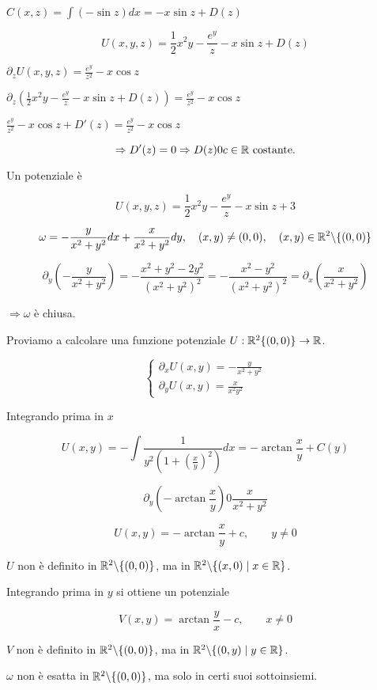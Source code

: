 \begin{exbar}
\begin{example}
	{\color{blue}$C(x,z)=\int (-\sin z)dx=-x\sin z+D(z)$}
	
	$$U(x,y,z)=\frac{1}{2}x^2y-\frac{e^y}{z}-x\sin z+D(z)$$
	
	$\partial_z U(x,y,z)=\frac{e^y}{z^2}-x\cos z$
	
	$\partial_z\left( \frac{1}{2}x^2y-\frac{e^y}{z}-x\sin z + D(z) \right)=\frac{e^y}{z^2}-x\cos z$
	
	$\frac{e^y}{z^2}-x\cos z+ D'(z)=\frac{e^y}{z^2}-x\cos z$
	
	$$\Rightarrow D'(z)=0\Rightarrow D(z)0c \in \mathbb{R} \text{ costante.}$$
	
	Un potenziale è 
	
	$$U(x,y,z)=\frac{1}{2}x^2y-\frac{e^y}{z}-x\sin z +3$$
\end{example}
\end{exbar}


\begin{exbar}
\begin{example}
	$$\omega = - \frac{y}{x^2+y^2}dx+\frac{x}{x^2+y^2}dy, \quad (x,y)\neq(0,0), \quad (x,y)\in \mathbb{R}^2\backslash\{(0,0)\}$$
	
	$$\partial_y\left( -\frac{y}{x^2+y^2} \right)=-\frac{x^2+y^2-2y^2}{(x^2+y^2)^2}=-\frac{x^2-y^2}{(x^2+y^2)^2}=\partial_x\left( \frac{x}{x^2+y^2} \right)$$
	
	$\Rightarrow \omega$ è chiusa.
	
	Proviamo a calcolare una funzione potenziale $U:\mathbb{R}^2\{(0,0)\}\rightarrow\mathbb{R}$.
	
	$$\begin{cases}
		\partial_xU(x,y)=-\frac{y}{x^2+y^2}\\
		\partial_yU(x,y)=\frac{x}{x^2y^2}
	\end{cases}$$
	
	Integrando prima in $x$
	
	$$U(x,y)=-\int\frac{1}{y^2\left(1+ \left(\frac{x}{y}\right)^2 \right)}dx=-\arctan \frac{x}{y} + C(y)$$
	
	$$\partial_y(-\arctan \frac{x}{y})0\frac{x}{x^2+y^2}$$
	
	$$U(x,y)=-\arctan \frac{x}{y}+c, \qquad y \neq 0$$
	
	$U$ non è definito in $\mathbb{R}^2 \backslash\{(0,0)\}$, ma in $\mathbb{R}^2\backslash \{(x,0)\mid x \in\mathbb{R}\}$.
	
	Integrando prima in $y$ si ottiene un potenziale 
	
	$$V(x,y)=\arctan \frac{y}{x}-c, \qquad x\neq 0$$
	
	$V$ non è definito in $\mathbb{R}^2\backslash\{(0,0)\}$, ma in $\mathbb{R}^2\backslash\{(0,y)\mid y \in \mathbb{R}\}$.
	
	$\omega$ non è esatta in $\mathbb{R}^2\backslash\{(0,0)\}$, ma solo in certi suoi sottoinsiemi.
\end{example}
\end{exbar}


